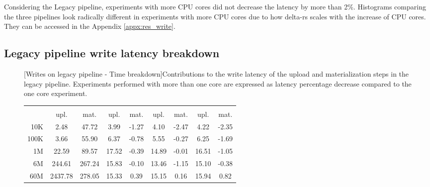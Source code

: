 Considering the Legacy pipeline, experiments with more \gls{CPU} cores did not decrease the latency by more than 2\%. Histograms comparing the three pipelines look radically different in experiments with more \gls{CPU} cores due to how delta-rs scales with the increase of \gls{CPU} cores. They can be accessed in the Appendix \ref{appx:res_write}.

\subsection{Legacy pipeline write latency breakdown}

\begin{figure}
    \centering
    \begin{minipage}[b]{\textwidth}
        [Writes on legacy pipeline - Time breakdown]{Contributions to the write latency of the upload and materialization steps in the legacy pipeline. Experiments performed with more than one  core are expressed as latency percentage decrease compared to the one  core experiment.}
        \label{tbl:hudi_virtualiz_breakdown_cpu_perc}
        \begin{tabular}{r S[table-format=4.2] S[table-format=4.2] S[table-format=2.2] S[table-format=2.2] S[table-format=2.2] S[table-format=2.2] S[table-format=2.2] S[table-format=2.2]} 
            \toprule
             &  &  &  & \\
            & {upl.} & {mat.} & {upl.} & {mat.} & {upl.} & {mat.} & {upl.} & {mat.}\\
            \midrule
            10K &  2.48 & 47.72 & 3.99 & -1.27 & 4.10 & -2.47 & 4.22 & -2.35\\
            100K & 3.66 & 55.90 & 6.37 & -0.78 & 5.55 & -0.27 & 6.25 & -1.69\\
            1M   & 22.59 & 89.57 & 17.52 & -0.39 & 14.89 & -0.01 & 16.51 & -1.05\\
            6M   & 244.61 & 267.24 & 15.83 & -0.10 & 13.46 & -1.15 & 15.10 & -0.38\\
            60M &  2437.78 & 278.05 & 15.33 & 0.39 & 15.15 & 0.16 & 15.94 & 0.82\\

\end{tabular}
\end{minipage}
\end{figure}
